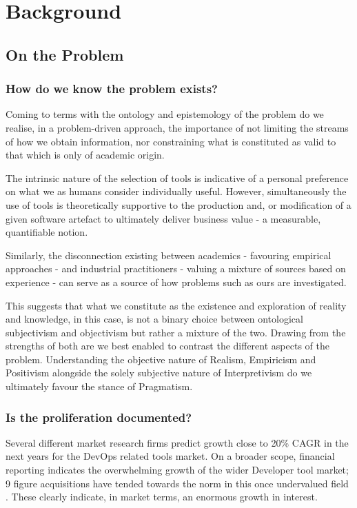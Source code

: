 \chapter{Background}

\section{On the Problem}

\subsection{How do we know the problem exists?}

Coming to terms with the ontology and epistemology of the problem do we realise, in a problem-driven approach, the importance of not limiting the streams of how we obtain information, nor constraining what is constituted as valid to that which is only of academic origin.

The intrinsic nature of the selection of tools is indicative of a personal preference on what we as humans consider individually useful. However, simultaneously the use of tools is theoretically supportive to the production and, or modification of a given software artefact to ultimately deliver business value - a measurable, quantifiable notion.

Similarly, the disconnection existing between academics - favouring empirical approaches - and industrial practitioners - valuing a mixture of sources based on experience - can serve as a source of how problems such as ours are investigated.

This suggests that what we constitute as the existence and exploration of reality and knowledge, in this case, is not a binary choice between ontological subjectivism and objectivism but rather a mixture of the two. Drawing from the strengths of both are we best enabled to contrast the different aspects of the problem. Understanding the objective nature of Realism, Empiricism and Positivism alongside the solely subjective nature of Interpretivism do we ultimately favour the stance of Pragmatism.

\subsection{Is the proliferation documented?}

Several different market research firms predict growth close to 20\% CAGR in the next years \parencite{techNavio} for the DevOps related tools market. On a broader scope, financial reporting indicates the overwhelming growth of the wider Developer tool market; 9 figure acquisitions have tended towards the norm in this once undervalued field \parencite{forbesDevToolsGrowth}. These clearly indicate, in market terms, an enormous growth in interest.

